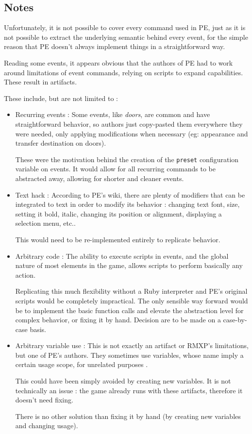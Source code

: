 \documentclass[11pt]{article}
\begin{document}
\newpage
\subsection{Notes}

Unfortunately, it is not possible to cover every command used in PE, just as it is not possible to extract the underlying semantic behind every event, for the simple reason that PE doesn't always implement things in a straightforward way.

Reading some events, it appears obvious that the authors of PE had to work around limitations of event commands, relying on scripts to expand capabilities. These result in artifacts.

These include, but are not limited to :
\begin{itemize}
	\item Recurring events : Some events, like \textit{doors}, are common and have straightforward behavior, so authors just copy-pasted them everywhere they were needed, only applying modifications when necessary (eg: appearance and transfer destination on doors).
	
	These were the motivation behind the creation of the \verb|preset| configuration variable on events. It would allow for all recurring commands to be abstracted away, allowing for shorter and cleaner events.
	
	\item Text hack : According to PE's wiki, there are plenty of modifiers that can be integrated to text in order to modify its behavior : changing text font, size, setting it bold, italic, changing its position or alignment, displaying a selection menu, etc..
	
	This would need to be re-implemented entirely to replicate behavior.
	
	\item Arbitrary code : The ability to execute scripts in events, and the global nature of most elements in the game, allows scripts to perform basically any action.
	
	Replicating this much flexibility without a Ruby interpreter and PE's original scripts would be completely impractical. The only sensible way forward would be to implement the basic function calls and elevate the abstraction level for complex behavior, or fixing it by hand. Decision are to be made on a case-by-case basis.
	
	\item Arbitrary variable use : This is not exactly an artifact or RMXP's limitations, but one of PE's authors. They sometimes use variables,  whose name imply a certain usage scope, for unrelated purposes
	. 
	
	This could have been simply avoided by creating new variables. It is not technically an issue : the game already runs with these artifacts, therefore it doesn't need fixing.
	
	There is no other solution than fixing it by hand (by creating new variables and changing usage).
	
\end{itemize} 
\end{document}
